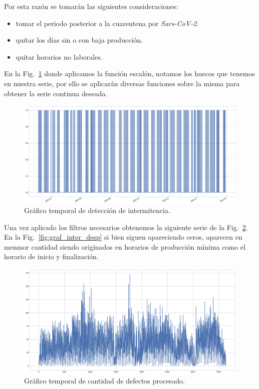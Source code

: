 \documentclass[a4paper,12pt]{article}
\begin{document}
Por esta razón se tomarán las siguientes consideraciones:

\begin{itemize}[noitemsep, topsep=2pt]
	\item tomar el periodo posterior a la cuarentena por \textit{Sars-CoV-2}.
	\item quitar los días sin o con baja producción.
	\item quitar horarios no laborales.
\end{itemize}

En la Fig.~\ref{fig:graf_inter_antes} donde aplicamos la función escalón, notamos los huecos que tenemos en nuestra serie, por ello se aplicarán diversas funciones sobre la misma para obtener la serie continua deseada.

\begin{figure}[H]
	\begin{center}
	\includegraphics[width=1\textwidth]{tesis_79.png}
  	\caption{Gráfico temporal de detección de intermitencia.}
  	\label{fig:graf_inter_antes}
  	\end{center}
\end{figure}

Una vez aplicado los filtros necesarios obtenemos la siguiente serie de la Fig.~\ref{fig:graf_cantdef_desp}. En la Fig.~\ref{fig:graf_inter_desp} si bien siguen apareciendo ceros, aparecen en menmor cantidad siendo originados en horarios de producción mínima como el horario de inicio y finalización.

\begin{figure}[H]
	\begin{center}
	\includegraphics[width=1\textwidth]{tesis_80.png}
  	\caption{Gráfico temporal de cantidad de defectos procesado.}
  	\label{fig:graf_cantdef_desp}
  	\end{center}
\end{figure}
\end{document}

